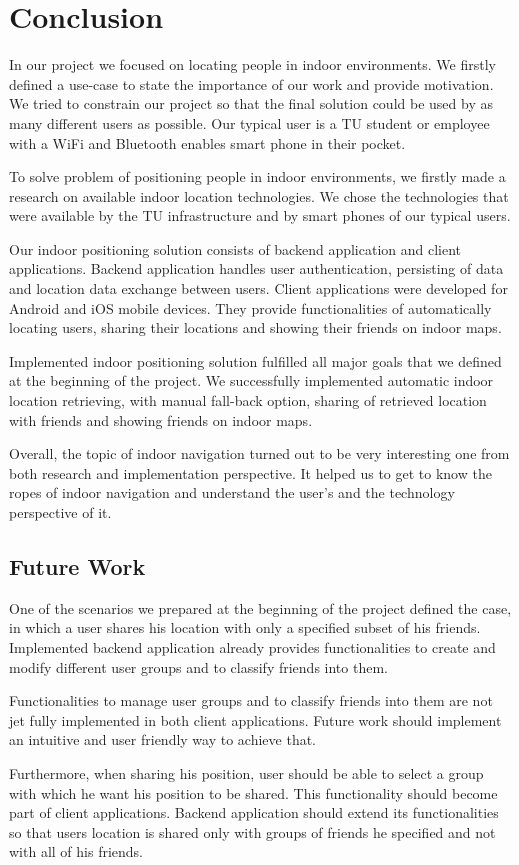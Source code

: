 \chapter{Conclusion}
\label{cha:conclusion}
\vspace{-0.5cm}

In our project we focused on locating people in indoor environments. We firstly defined a use-case to state the importance of our work and provide motivation. We tried to constrain our project so that the final solution could be used by as many different users as possible. Our typical user is a TU student or employee with a WiFi and Bluetooth enables smart phone in their pocket.

To solve problem of positioning people in indoor environments, we firstly made a research on available indoor location technologies. We chose the technologies that were available by the TU infrastructure and by smart phones of our typical users.

Our indoor positioning solution consists of backend application and client applications. Backend application handles user authentication, persisting of data and location data exchange between users. Client applications were developed for Android and iOS mobile devices. They provide functionalities of automatically locating users, sharing their locations and showing their friends on indoor maps.

Implemented indoor positioning solution fulfilled all major goals that we defined at the beginning of the project. We successfully implemented automatic indoor location retrieving, with manual fall-back option, sharing of retrieved location with friends and showing friends on indoor maps.

Overall, the topic of indoor navigation turned out to be very interesting one from both research and implementation perspective. It helped us to get to know the ropes of indoor navigation and understand the user's and the technology perspective of it.

\vspace{0.5cm}

\section{Future Work}

One of the scenarios we prepared at the beginning of the project defined the case, in which a user shares his location with only a specified subset of his friends. Implemented backend application already provides functionalities to create and modify different user groups and to classify friends into them.

Functionalities to manage user groups and to classify friends into them are not jet fully implemented in both client applications. Future work should implement an intuitive and user friendly way to achieve that.

Furthermore, when sharing his position, user should be able to select a group with which he want his position to be shared. This functionality should become part of client applications. Backend application should extend its functionalities so that users location is shared only with groups of friends he specified and not with all of his friends.

